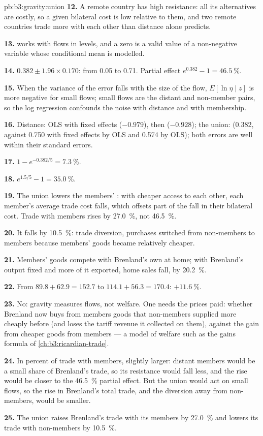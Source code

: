 \begin{solution}{pb:b3:gravity:union}
\textbf{12.} A remote country has high resistance: all its alternatives are
costly, so a given bilateral cost is low relative to them, and two remote
countries trade more with each other than distance alone predicts.

\textbf{13.}  works with flows in levels, and a zero is a valid value of a
non-negative variable whose conditional mean is modelled.

\textbf{14.} $0.382 \pm 1.96 \times 0.170$: from 0.05 to 0.71. Partial effect $e^{0.382} - 1 =
46.5~\%$.

\textbf{15.} When the variance of the error falls with the size of the flow,
$E[\ln \eta \mid z]$ is more negative for small flows; small flows are the distant
and non-member pairs, so the log regression confounds the noise with distance
and with membership.

\textbf{16.} Distance: OLS with fixed effects ($-0.979$), then  ($-0.928$); the
union:  (0.382, against 0.750 with fixed effects by OLS and 0.574 by OLS);
both  errors are well within their standard errors.

\textbf{17.} $1 - e^{-0.382/5} = 7.3~\%$.

\textbf{18.} $e^{1.5/5} - 1 = 35.0~\%$.

\textbf{19.} The union lowers the members' : with cheaper
access to each other, each member's average trade cost falls, which offsets part
of the fall in their bilateral cost. Trade with members rises by 27.0~\%, not 46.5~\%.

\textbf{20.} It falls by 10.5~\%: trade diversion, purchases switched from
non-members to members because members' goods became relatively cheaper.

\textbf{21.} Members' goods compete with Brenland's own at home; with Brenland's
output fixed and more of it exported, home sales fall, by 20.2~\%.

\textbf{22.} From $89.8 + 62.9 = 152.7$ to $114.1 + 56.3 = 170.4$: $+11.6~\%$.

\textbf{23.} No: gravity measures flows, not welfare. One needs the prices paid:
whether Brenland now buys from members goods that non-members supplied more
cheaply before (and loses the tariff revenue it collected on them), against the
gain from cheaper goods from members --- a model of welfare such as the gains
formula of \cref{ch:b3:ricardian-trade}.

\textbf{24.} In percent of trade with members, slightly larger: distant members
would be a small share of Brenland's trade, so its resistance would fall less,
and the rise would be closer to the 46.5~\% partial effect. But the union would act
on small flows, so the rise in Brenland's total trade, and the diversion away from
non-members, would be smaller.

\textbf{25.} The union raises Brenland's trade with its members by 27.0~\% and lowers
its trade with non-members by 10.5~\%.
\end{solution}
